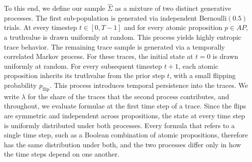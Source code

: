 \documentclass[titlepage,a4paper,11pt]{report}
\begin{document}
    To this end, we define our sample $\widehat\Sigma$ as a mixture of two distinct generative processes. The first sub-population is generated via independent Bernoulli$(0.5)$ trials. At every timestep $t \in [0, T-1]$ and for every atomic proposition $p \in AP$, a truthvalue is drawn uniformly at random. This process yields highly entropic trace behavior. The remaining trace sample is generated via a temporally correlated Markov process. For these traces, the initial state at $t=0$ is drawn uniformly at random. For every subsequent timestep $t+1$, each atomic proposition inherits its truthvalue from the prior step $t$, with a small flipping probability $p_{\text{flip}}$. This process introduces temporal persistence into the traces. We write $\lambda$ for the share of the traces that the second process contributes, and throughout, we evaluate formulae at the first time step of a trace. Since the flips are symmetric and independent across propositions, the state at every time step is uniformly distributed under both processes. Every formula that refers to a single time step, such as a Boolean combination of atomic propositions, therefore has the same distribution under both, and the two processes differ only in how the time steps depend on one another.
    
\end{document}
